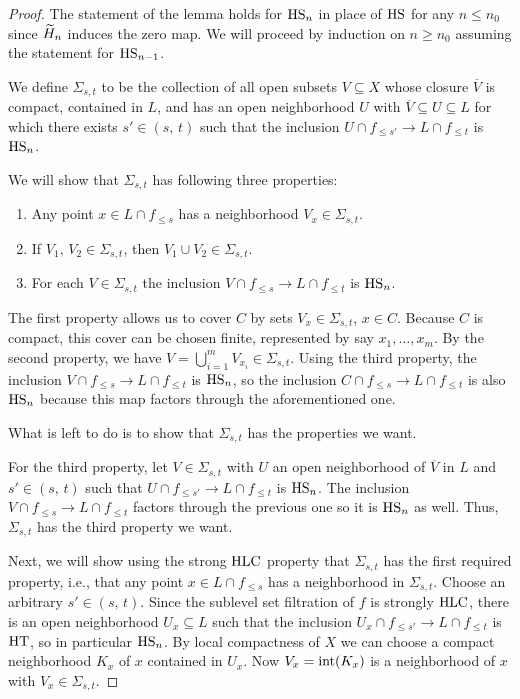 \begin{proof}
    The statement of the lemma holds for $\mathrm{HS}_{n}$ in place of $\mathrm{HS}$ for any $n \leq n_0$ since $\widetilde{H}_{n}$ induces the zero map.
    We will proceed by induction on $n \geq n_0$ assuming the statement for $\mathrm{HS}_{n-1}$.

    We define $\Sigma_{s, t}$ to be the collection of all open subsets $V \subseteq X$ whose closure $\overline{V}$ is compact, contained in $L$, and has an open neighborhood $U$ with 
	$\overline{V} \subseteq U \subseteq L$
	for which there exists $s' \in (s,\, t)$ such that the inclusion
    $U \cap f_{\leq s'} \to L \cap f_{\leq t}$
	is $\mathrm{HS}_n$. 
	
	We will show that $\Sigma_{s, t}$ has following three properties:
	\begin{enumerate}
	    \item Any point $x \in L \cap f_{\leq s}$ has a neighborhood $V_x \in \Sigma_{s,t}$.
	    \item If $V_1,\, V_2 \in \Sigma_{s,t}$, then $V_1 \cup V_2 \in \Sigma_{s,t}$.
	    \item For each $V \in \Sigma_{s,t}$ the inclusion 
	    $V \cap f_{\leq s} \to L \cap f_{\leq t}$ 
	    is $\mathrm{HS}_n$.
	\end{enumerate}
	
	The first property allows us to cover $C$ by sets $V_x \in \Sigma_{s,t}$, $x \in C$. 
	Because $C$ is compact, this cover can be chosen finite, represented by say $x_1,\dots, x_m$. 
	By the second property, we have $V = \bigcup_{i = 1}^m V_{x_i} \in \Sigma_{s,t}$.
	Using the third property, the inclusion 
	$V \cap f_{\leq s} \to L \cap f_{\leq t}$ 
	is $\mathrm{HS}_n$, so the inclusion 
	$C \cap f_{\leq s} \to L \cap f_{\leq t}$ 
	is also $\mathrm{HS}_n$ because this map factors through the aforementioned one.
	
	What is left to do is to show that $\Sigma_{s,t}$ has the properties we want.
	
	For the third property, let $V \in \Sigma_{s,t}$ with $U$ an open neighborhood of $\overline{V}$ in $L$ and $s' \in (s,\, t)$ such that 
	$U \cap f_{\leq s'} \to L \cap f_{\leq t}$
	is $\mathrm{HS}_n$. 
	The inclusion
	$V \cap f_{\leq s} \to L \cap f_{\leq t}$
	factors through the previous one %
	so it is $\mathrm{HS}_n$ as well. Thus, $\Sigma_{s, t}$ has the third property we want.
	
	Next, we will show using the strong $\mathrm{HLC}$ property that $\Sigma_{s, t}$ has the first required property, i.e., that any point $x \in L \cap f_{\leq s}$ has a neighborhood in $\Sigma_{s, t}$.
	Choose an arbitrary $s' \in (s,\, t)$.
	Since the sublevel set filtration of $f$ is strongly $\mathrm{HLC}$, there is an open neighborhood $U_x \subseteq L$ such that the inclusion
	$U_x \cap f_{\leq s'} \to L \cap f_{\leq t}$
	is $\mathrm{HT}$, so in particular $\mathrm{HS}_n$.
	By local compactness of $X$ we can choose a compact neighborhood $K_x$ of $x$ contained in $U_x$. 
	Now $V_x = \operatorname{int} (K_x)$ is a neighborhood of $x$ with $V_x \in \Sigma_{s,t}$.
	

\end{proof}
